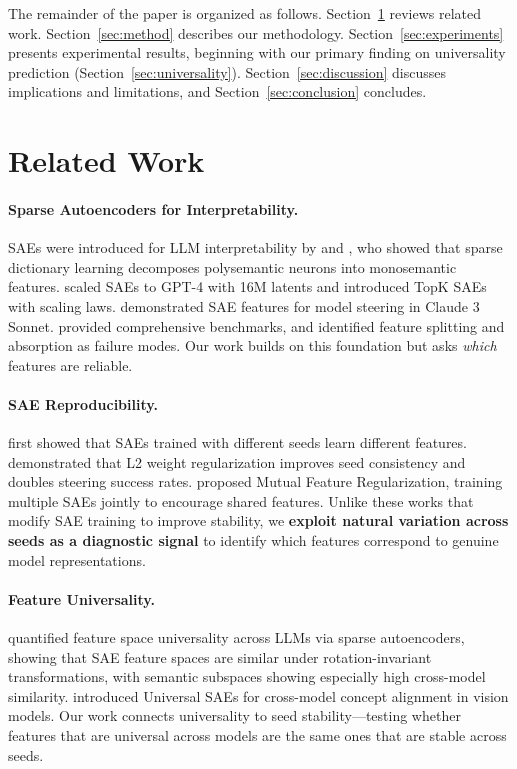 \documentclass[final]{article}
\begin{document}
The remainder of the paper is organized as follows. Section~\ref{sec:related} reviews related work. Section~\ref{sec:method} describes our methodology. Section~\ref{sec:experiments} presents experimental results, beginning with our primary finding on universality prediction (Section~\ref{sec:universality}). Section~\ref{sec:discussion} discusses implications and limitations, and Section~\ref{sec:conclusion} concludes.

\section{Related Work}
\label{sec:related}

\paragraph{Sparse Autoencoders for Interpretability.}
SAEs were introduced for LLM interpretability by \citet{cunningham2023sparse} and \citet{bricken2023monosemanticity}, who showed that sparse dictionary learning decomposes polysemantic neurons into monosemantic features. \citet{gao2024scaling} scaled SAEs to GPT-4 with 16M latents and introduced TopK SAEs with scaling laws. \citet{templeton2024scaling} demonstrated SAE features for model steering in Claude 3 Sonnet. \citet{karvonen2025saebench} provided comprehensive benchmarks, and \citet{chanin2025absorption} identified feature splitting and absorption as failure modes. Our work builds on this foundation but asks \emph{which} features are reliable.

\paragraph{SAE Reproducibility.}
\citet{paulo2025sparse} first showed that SAEs trained with different seeds learn different features. \citet{jedryszek2026stable} demonstrated that L2 weight regularization improves seed consistency and doubles steering success rates. \citet{marks2024enhancing} proposed Mutual Feature Regularization, training multiple SAEs jointly to encourage shared features. Unlike these works that modify SAE training to improve stability, we \textbf{exploit natural variation across seeds as a diagnostic signal} to identify which features correspond to genuine model representations.

\paragraph{Feature Universality.}
\citet{lan2024universal} quantified feature space universality across LLMs via sparse autoencoders, showing that SAE feature spaces are similar under rotation-invariant transformations, with semantic subspaces showing especially high cross-model similarity. \citet{thasarathan2025universal} introduced Universal SAEs for cross-model concept alignment in vision models. Our work connects universality to seed stability---testing whether features that are universal across models are the same ones that are stable across seeds.
\end{document}
